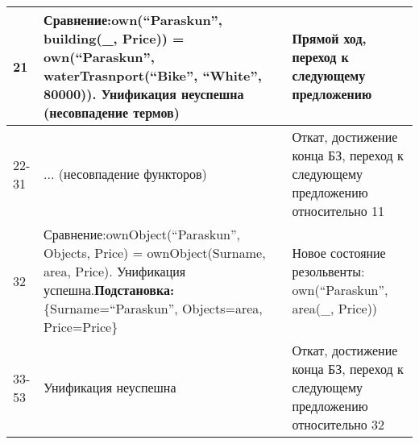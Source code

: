 \documentclass[14pt,a4paper]{scrreprt}
\begin{document}
\begin{table}[H]
\begin{tabular}{|p{1.2cm\small}|p{9cm\small}|p{5cm\small}|}
		\hline
		21 & Сравнение:\linebreak own(``Paraskun'', building(\_, Price)) = own(``Paraskun'', waterTrasnport(``Bike'', ``White'', 80000)). Унификация неуспешна (несовпадение термов) & Прямой ход, переход к следующему предложению\\
		\hline
		22-31 & ... (несовпадение функторов) & Откат, достижение конца БЗ, переход к следующему предложению относительно 11\\
		\hline
		32 & Сравнение:\linebreak ownObject(``Paraskun'', Objects, Price) = ownObject(Surname, area, Price). Унификация успешна.\linebreak \textbf{Подстановка:} \{Surname=``Paraskun'', Objects=area, Price=Price\} & Новое состояние резольвенты: own(``Paraskun'', area(\_, Price))\\
		\hline
		33-53 & Унификация неуспешна & Откат, достижение конца БЗ, переход к следующему предложению относительно 32\\
		\hline
	\end{tabular}
\end{table}
\end{document}
